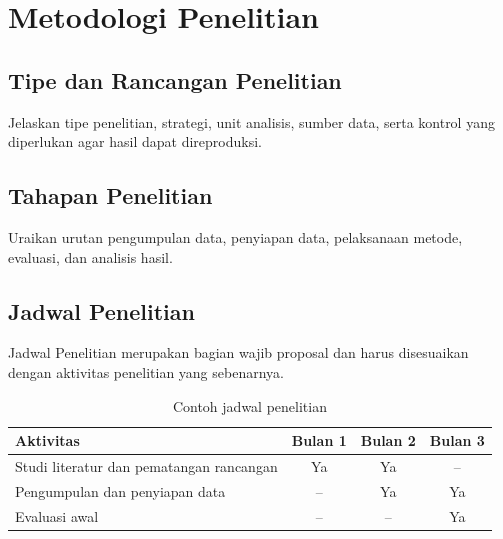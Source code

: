 \chapter{Metodologi Penelitian}
\section{Tipe dan Rancangan Penelitian}
Jelaskan tipe penelitian, strategi, unit analisis, sumber data, serta kontrol
yang diperlukan agar hasil dapat direproduksi.

\section{Tahapan Penelitian}
Uraikan urutan pengumpulan data, penyiapan data, pelaksanaan metode, evaluasi,
dan analisis hasil.

\section{Jadwal Penelitian}
Jadwal Penelitian merupakan bagian wajib proposal dan harus disesuaikan dengan
aktivitas penelitian yang sebenarnya.
\begin{table}[htbp]
  \centering
  \caption{Contoh jadwal penelitian}
  \label{tab:jadwal}
  \begin{tabular}{p{}ccc}
    \toprule
    Aktivitas & Bulan 1 & Bulan 2 & Bulan 3 \\
    \midrule
    Studi literatur dan pematangan rancangan & Ya & Ya & -- \\
    Pengumpulan dan penyiapan data & -- & Ya & Ya \\
    Evaluasi awal & -- & -- & Ya \\
    \bottomrule
  \end{tabular}
\end{table}
